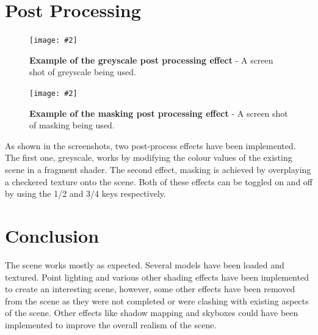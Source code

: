 \documentclass[10pt, a4paper]{article}
\newcommand{\figuremacro}[5]{
    \begin{figure}[#1]
        \centering
        \texttt{[image: \#2]}
        \caption[#3]{\textbf{#3}#4}
        \label{fig:#2}
    \end{figure}
}
\begin{document}
\section{Post Processing}

\figuremacro{h}{greyscale}{Example of the greyscale post processing effect}{ - A screen shot of greyscale being used.}{1.0}

\figuremacro{h}{masking}{Example of the masking post processing effect}{ - A screen shot of masking being used.}{1.0}

As shown in the screenshots, two post-process effects have been implemented. The
first one, greyscale, works by modifying the colour values
of the existing scene in a fragment shader. The second effect, masking is achieved by overplaying a checkered texture onto the scene. Both of these effects can be toggled on and off by using the 1/2 and 3/4 keys respectively.





	
\section{Conclusion}
The scene works mostly as expected. Several models have been loaded and textured. Point lighting and various  other shading effects have been implemented to create an interesting scene, however, some other effects have been removed from the scene as they were not completed or were clashing with existing aspects of the scene. Other effects like shadow mapping and skyboxes could have been implemented to improve the overall realism of the scene. 

		
\end{document}
